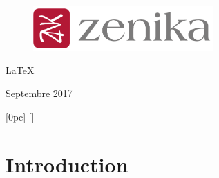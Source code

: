 \documentclass[twoside, 12pt]{report}
\begin{document}
\begin{titlepage}
\begin{sffamily}
\begin{center}
			\vfill
			
			\begin{figure}[h]
				\begin{minipage}{1\textwidth}
					\centering
					\includegraphics[width=6.9cm]{img/logo_zenika.png}
				\end{minipage}%
			\end{figure}
			 
			\LaTeX

			\vfill
			{\large Septembre 2017}
		\end{center}
	\end{sffamily}
\end{titlepage}

\vfill

\thispagestyle{empty}
\cleardoublepage
\thispagestyle{empty}


%

%

\clearpage
\thispagestyle{empty}
\setcounter{tocdepth}{2}


\tableofcontents
\thispagestyle{empty}

	[0pc] %
	{}%
	{\textsc{\textbf{ \thecontentslabel}} \large}%
	{\textsc{\textbf{ \thecontentslabel}} \large} %
	{\dotfill \contentspage}%
	[\addvspace{.0001pc}]%
\thispagestyle{empty}

\cleardoublepage
\setcounter{page}{1}
\section*{\textbf{Introduction}}
\label{sect:Introduction}

\end{document}
